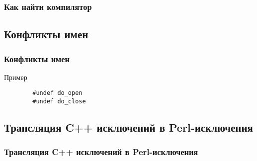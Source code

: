 \documentclass[utf8x]{beamer}
\begin{document}
\begin{frame}
    \frametitle{Как найти компилятор}
\end{frame}

\subsection{Конфликты имен}

\begin{frame}[fragile]
    \frametitle{Конфликты имен}
    \begin{exampleblock}{Пример}
        \begin{lstlisting}
        #undef do_open
        #undef do_close
        \end{lstlisting}
    \end{exampleblock}
\end{frame}

\subsection{Трансляция C++ исключений в Perl-исключения}

\begin{frame}
    \frametitle{Трансляция C++ исключений в Perl-исключения}
\end{frame}
\end{document}
